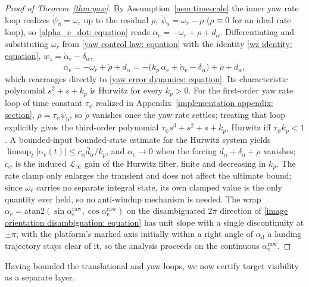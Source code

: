 \documentclass{IEEEtaes}
\theoremstyle{definition}
\theoremstyle{remark}
\begin{document}
\begin{proof}[Proof of Theorem~\ref{thm:yaw}] By Assumption~\ref{asm:timescale} the inner yaw rate loop realizes $\dot{\psi}_\text{d}=\omega_r$ up to the residual $\rho$, $\dot{\psi}_\text{b}=\omega_r-\rho$ ($\rho\equiv0$ for an ideal rate loop), so \eqref{alpha_e_dot: equation} reads $\dot{\alpha}_\text{e}=-\omega_r+\rho+d_\alpha$. Differentiating and substituting $\dot{\omega}_r$ from \eqref{yaw control law: equation} with the identity \eqref{wz identity: equation}, $w_z=\dot{\alpha}_\text{e}-\delta_\alpha$,
\begin{equation*}
    \ddot{\alpha}_\text{e} = -\dot{\omega}_r + \dot{\rho} + \dot{d}_\alpha
      = -\big(k_p\,\alpha_\text{e} + \dot{\alpha}_\text{e} - \delta_\alpha\big) + \dot{\rho} + \dot{d}_\alpha,
\end{equation*}
which rearranges directly to \eqref{yaw error dynamics: equation}. Its characteristic polynomial $s^2+s+k_p$ is Hurwitz for every $k_p>0$. For the first-order yaw rate loop of time constant $\tau_\psi$ realized in Appendix~\ref{implementation appendix: section}, $\rho=\tau_\psi\ddot{\psi}_\text{b}$, so $\dot{\rho}$ vanishes once the yaw rate settles; treating that loop explicitly gives the third-order polynomial $\tau_\psi s^3+s^2+s+k_p$, Hurwitz iff $\tau_\psi k_p<1$. A bounded-input bounded-state estimate for the Hurwitz system yields $\limsup_t|\alpha_\text{e}(t)|\le c_\alpha\bar{d}_\alpha/k_p$, and $\alpha_\text{e}\to0$ when the forcing $\dot{d}_\alpha+\delta_\alpha+\dot{\rho}$ vanishes; $c_\alpha$ is the induced $\mathcal{L}_\infty$ gain of the Hurwitz filter, finite and decreasing in $k_p$. The rate clamp only enlarges the transient and does not affect the ultimate bound; since $\omega_r$ carries no separate integral state, its own clamped value is the only quantity ever held, so no anti-windup mechanism is needed. The wrap $\alpha_\text{e}=\text{atan2}(\sin\alpha_\text{e}^\text{raw},\cos\alpha_\text{e}^\text{raw})$ on the disambiguated $2\pi$ direction of \eqref{image orientation disambiguation: equation} has unit slope with a single discontinuity at $\pm\pi$; with the platform's marked axis initially within a right angle of $\alpha_\text{d}$ a landing trajectory stays clear of it, so the analysis proceeds on the continuous $\alpha_\text{e}^\text{raw}$. \end{proof}

Having bounded the translational and yaw loops, we now certify target visibility as a separate layer.
\end{document}
